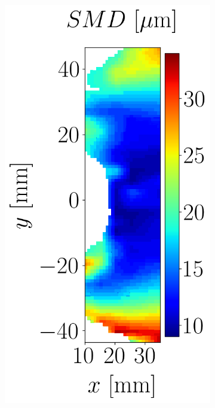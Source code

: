 \begin{figure}[h!]
\flushleft
\begin{subfigure}[b]{0.45\textwidth}
	\flushright
   \includegraphics[scale=0.3]{./part3_applications/figures_ch9_lagrangian/expe_maps/SMD_map.png}
\end{subfigure}

\end{figure}
